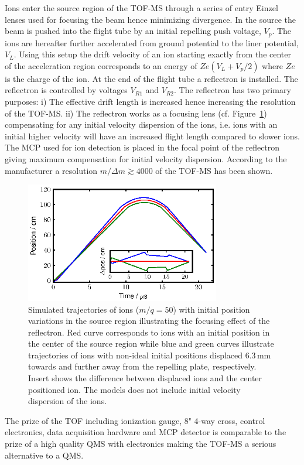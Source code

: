 \documentclass[aip,rsi]{revtex4-1}
\begin{document}
Ions enter the source region of the TOF-MS through a series of entry Einzel lenses used for focusing the beam hence minimizing divergence. In the source the beam is pushed into the flight tube by an initial repelling push voltage, $V_p$. The ions are hereafter further accelerated from ground potential to the liner potential, $V_L$. Using this setup the drift velocity of an ion starting exactly from the center of the acceleration region corresponds to an energy of $Ze\left(V_L + V_p/2\right)$ where $Ze$ is the charge of the ion. At the end of the flight tube a reflectron is installed. The reflectron is controlled by voltages $V_{R1}$ and $V_{R2}$. The reflectron has two primary purposes: i) The effective drift length is increased hence increasing the resolution of the TOF-MS. ii) The reflectron works as a focusing lens (cf. Figure~\ref{fig:trajectory}) compensating for any initial velocity dispersion of the ions, i.e. ions with an initial higher velocity will have an increased flight length compared to slower ions. The MCP used for ion detection is placed in the focal point of the reflectron giving maximum compensation for initial velocity dispersion. According to the manufacturer a resolution $m/\Delta m\gtrsim4000$ of the TOF-MS has been shown.
\begin{figure}
 \includegraphics[width=8.5cm]{trajectory.eps}%
 \caption{Simulated trajectories of ions ($m/q=50$) with initial position variations in the source region illustrating the focusing effect of the reflectron. Red curve corresponds to ions with an initial position in the center of the source region while blue and green curves illustrate trajectories of ions with non-ideal initial positions displaced 6.3\,mm towards and further away from the repelling plate, respectively. Insert shows the difference between displaced ions and the center positioned ion. The models does not include initial velocity dispersion of the ions.\label{fig:trajectory}}%
\end{figure}

The prize of the TOF including ionization gauge, 8" 4-way cross, control electronics, data acquisition hardware and MCP detector is comparable to the prize of a high quality QMS with electronics making the TOF-MS a serious alternative to a QMS.
\end{document}
